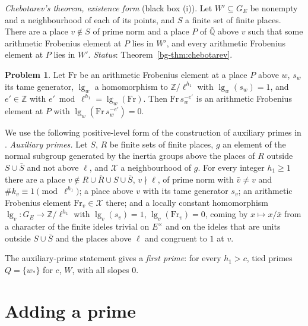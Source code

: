 \documentclass[reqno]{amsart}
\theoremstyle{definition}
\newtheorem{problem}{Problem}[section]
\theoremstyle{plain}
\newcommand{\Z}{\mathbb{Z}}
\newcommand{\Q}{\mathbb{Q}}
\newcommand{\Fr}{\mathrm{Fr}}
\newcommand{\Xc}{\mathcal{X}}
\begin{document}
\emph{Chebotarev's theorem, existence form} (black box (i)).  Let \(W' \subseteq G_E\) be nonempty and a neighbourhood of each of its points, and \(S\) a finite set of finite places.  There are a place \(v \notin S\) of prime norm and a place \(P\) of \(\bar{\Q}\) above \(v\) such that some arithmetic Frobenius element at \(P\) lies in \(W'\), and every arithmetic Frobenius element at \(P\) lies in \(W'\).  \emph{Status}: Theorem~\ref{bg-thm:chebotarev}.

\begin{problem}\label{pr:correct}
Let \(\Fr\) be an arithmetic Frobenius element at a place \(P\) above \(w\), \(s_w\) its tame generator, \(\lg_w\) a homomorphism to \(\Z/\ell^{h_1}\) with \(\lg_w(s_w) = 1\), and \(e' \in \Z\) with \(e' \bmod \ell^{h_1} = \lg_w(\Fr)\).  Then \(\Fr\, s_w^{-e'}\) is an arithmetic Frobenius element at \(P\) with \(\lg_w(\Fr\, s_w^{-e'}) = 0\).
\end{problem}

We use the following positive-level form of the construction of auxiliary primes in \cite{GL}.  \emph{Auxiliary primes.}  Let \(S\), \(R\) be finite sets of finite places, \(g\) an element of the normal subgroup generated by the inertia groups above the places of \(R\) outside \(S \cup \bar S\) and not above \(\ell\), and \(\Xc\) a neighbourhood of \(g\).  For every integer \(h_1 \ge 1\) there are a place \(v \notin R \cup \bar R \cup S \cup \bar S\), \(v \nmid \ell\), of prime norm with \(\bar v \ne v\) and \(\#k_v \equiv 1 \pmod{\ell^{h_1}}\); a place above \(v\) with its tame generator \(s_v\); an arithmetic Frobenius element \(\Fr_v \in \Xc\) there; and a locally constant homomorphism \(\lg_v \colon G_E \to \Z/\ell^{h_1}\) with \(\lg_v(s_v) = 1\), \(\lg_v(\Fr_v) = 0\), coming by \(x \mapsto x/\bar x\) from a character of the finite ideles trivial on \(E^\times\) and on the ideles that are units outside \(S \cup \bar S\) and the places above \(\ell\) and congruent to \(1\) at \(v\).

The auxiliary-prime statement gives a \emph{first prime}: for every \(h_1 > c\), tied primes \(Q = \{w_*\}\) for \(c\), \(W\), with all slopes \(0\).

\section{Adding a prime}\label{sec:adding}
\end{document}
